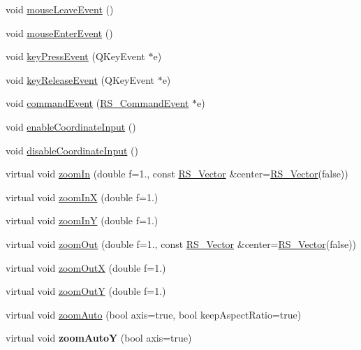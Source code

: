 \begin{DoxyCompactItemize}
\item 
void \hyperlink{classRS__GraphicView_a66ac902166fe3823622dd6c2eb226d7c}{mouse\-Leave\-Event} ()
\item 
void \hyperlink{classRS__GraphicView_ad7f33080610e836e1f82368e491b9704}{mouse\-Enter\-Event} ()
\item 
void \hyperlink{classRS__GraphicView_a5cfbfe85b12ef28597109e7b8b23503a}{key\-Press\-Event} (Q\-Key\-Event $\ast$e)
\item 
void \hyperlink{classRS__GraphicView_a34de85c07720f9d3fb1fc825e31a28db}{key\-Release\-Event} (Q\-Key\-Event $\ast$e)
\item 
void \hyperlink{classRS__GraphicView_ab9f5865faadd21180286c643631fc9c3}{command\-Event} (\hyperlink{classRS__CommandEvent}{R\-S\-\_\-\-Command\-Event} $\ast$e)
\item 
void \hyperlink{classRS__GraphicView_a6e6978abfdc6e3fc47d0c862dcafe854}{enable\-Coordinate\-Input} ()
\item 
void \hyperlink{classRS__GraphicView_a283b0e4706e30b4b1c1645f74552e9af}{disable\-Coordinate\-Input} ()
\item 
virtual void \hyperlink{classRS__GraphicView_a0cd13dfb56671d262a0c7c73abee0283}{zoom\-In} (double f=1., const \hyperlink{classRS__Vector}{R\-S\-\_\-\-Vector} \&center=\hyperlink{classRS__Vector}{R\-S\-\_\-\-Vector}(false))
\item 
virtual void \hyperlink{classRS__GraphicView_ad0aea27438b47700f4fc242fc0e764eb}{zoom\-In\-X} (double f=1.)
\item 
virtual void \hyperlink{classRS__GraphicView_afdcaa3c792eca9e25dbcbda7b762e2ae}{zoom\-In\-Y} (double f=1.)
\item 
virtual void \hyperlink{classRS__GraphicView_a49ec55150d1dec6c61261a51dd422972}{zoom\-Out} (double f=1., const \hyperlink{classRS__Vector}{R\-S\-\_\-\-Vector} \&center=\hyperlink{classRS__Vector}{R\-S\-\_\-\-Vector}(false))
\item 
virtual void \hyperlink{classRS__GraphicView_a9539826899c38ff7f20bbfe034f5562c}{zoom\-Out\-X} (double f=1.)
\item 
virtual void \hyperlink{classRS__GraphicView_a2d70a33d9b86ccfe065bcca5c0d3e814}{zoom\-Out\-Y} (double f=1.)
\item 
virtual void \hyperlink{classRS__GraphicView_ad938b6866368bc4615887ace3e464040}{zoom\-Auto} (bool axis=true, bool keep\-Aspect\-Ratio=true)
\item 
\hypertarget{classRS__GraphicView_a57d3dd0b99100c111ef025ca6f876ae8}{virtual void {\bfseries zoom\-Auto\-Y} (bool axis=true)}\label{classRS__GraphicView_a57d3dd0b99100c111ef025ca6f876ae8}


\end{DoxyCompactItemize}
